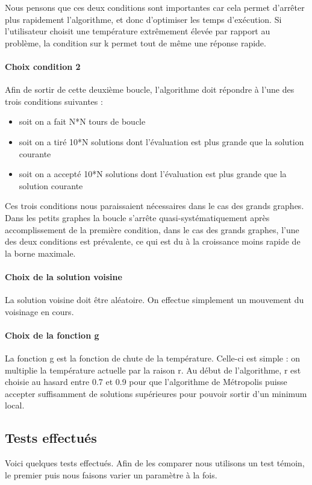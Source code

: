 \documentclass[12pt]{article}
\begin{document}
Nous pensons que ces deux conditions sont importantes car cela permet d'arrêter plus rapidement l'algorithme, et donc d’optimiser les temps d’exécution. Si l’utilisateur choisit une température extrêmement élevée par rapport au problème, la condition sur k permet tout de même une réponse rapide.

\paragraph{Choix condition 2} Afin de sortir de cette deuxième boucle, l’algorithme doit répondre à l’une des trois conditions suivantes :
	\begin{itemize}
	\item soit on a fait N*N tours de boucle
	\item soit on a tiré 10*N solutions dont l’évaluation est plus grande que la solution courante
	\item soit on a accepté 10*N solutions dont l’évaluation est plus grande que la solution courante
	\end{itemize}
Ces trois conditions nous paraissaient nécessaires dans le cas des grands graphes. Dans les petits graphes la boucle s'arrête quasi-systématiquement après accomplissement de la première condition, dans le cas des grands graphes, l’une des deux conditions est prévalente, ce qui est du à la croissance moins rapide de la borne maximale.


\paragraph{Choix de la solution voisine} La solution voisine doit être aléatoire. On effectue simplement un mouvement du voisinage en cours.
\paragraph{Choix de la fonction g} La fonction g est la fonction de chute de la température. Celle-ci est simple : on multiplie la température actuelle par la raison r. Au début de l’algorithme, r est choisie au hasard entre 0.7 et 0.9 pour que l’algorithme de Métropolis puisse accepter suffisamment de solutions supérieures pour pouvoir sortir d’un minimum local. 

\subsection{Tests effectués}
Voici quelques tests effectués. Afin de les comparer nous utilisons un test témoin, le premier puis nous faisons varier un paramètre à la fois.
\end{document}
